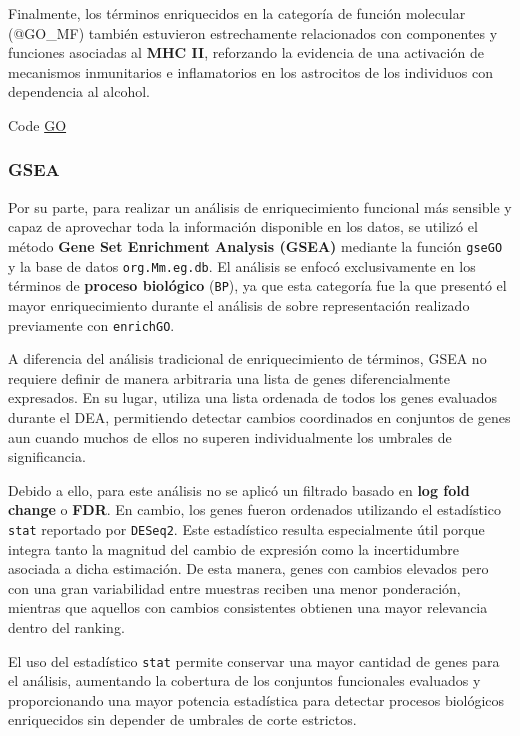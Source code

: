 \documentclass[
  9pt,
]{article}
\begin{document}
Finalmente, los términos enriquecidos en la categoría de función
molecular (@GO\_MF) también estuvieron estrechamente relacionados con
componentes y funciones asociadas al \textbf{MHC II}, reforzando la
evidencia de una activación de mecanismos inmunitarios e inflamatorios
en los astrocitos de los individuos con dependencia al alcohol.

Code \hyperref[Func_en_GO]{GO}

\subsubsection{GSEA}\label{gsea}

Por su parte, para realizar un análisis de enriquecimiento funcional más
sensible y capaz de aprovechar toda la información disponible en los
datos, se utilizó el método \textbf{Gene Set Enrichment Analysis (GSEA)}
mediante la función \texttt{gseGO} y la base de datos
\texttt{org.Mm.eg.db}. El análisis se enfocó exclusivamente en los
términos de \textbf{proceso biológico} (\texttt{BP}), ya que esta
categoría fue la que presentó el mayor enriquecimiento durante el
análisis de sobre representación realizado previamente con
\texttt{enrichGO}.

A diferencia del análisis tradicional de enriquecimiento de términos,
GSEA no requiere definir de manera arbitraria una lista de genes
diferencialmente expresados. En su lugar, utiliza una lista ordenada de
todos los genes evaluados durante el DEA, permitiendo detectar cambios
coordinados en conjuntos de genes aun cuando muchos de ellos no superen
individualmente los umbrales de significancia.

Debido a ello, para este análisis no se aplicó un filtrado basado en
\textbf{log fold change} o \textbf{FDR}. En cambio, los genes fueron
ordenados utilizando el estadístico \texttt{stat} reportado por
\texttt{DESeq2}. Este estadístico resulta especialmente útil porque
integra tanto la magnitud del cambio de expresión como la incertidumbre
asociada a dicha estimación. De esta manera, genes con cambios elevados
pero con una gran variabilidad entre muestras reciben una menor
ponderación, mientras que aquellos con cambios consistentes obtienen una
mayor relevancia dentro del ranking.

El uso del estadístico \texttt{stat} permite conservar una mayor
cantidad de genes para el análisis, aumentando la cobertura de los
conjuntos funcionales evaluados y proporcionando una mayor potencia
estadística para detectar procesos biológicos enriquecidos sin depender
de umbrales de corte estrictos.
\end{document}
